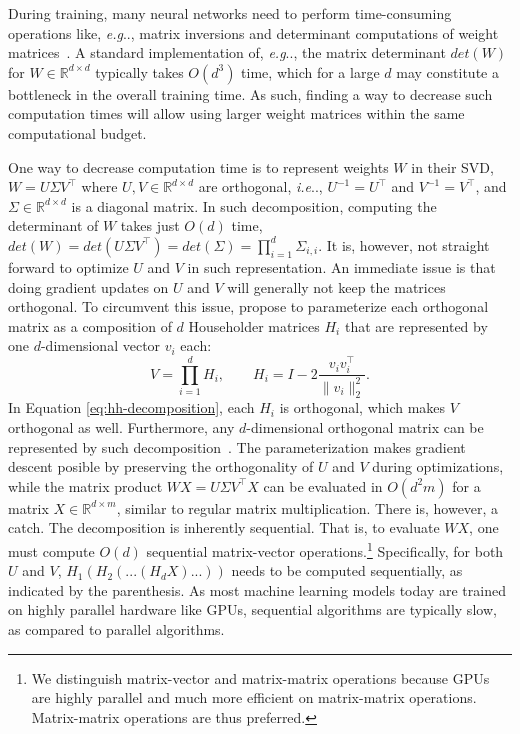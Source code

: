 \documentclass[11pt,a4paper,twoside,openright,final]{memoir}
\makeatletter
\DeclareRobustCommand\onedot{\futurelet\@let@token\@onedot}
\def\@onedot{\ifx\@let@token.\else.\null\fi\xspace}
\def\eg{\emph{e.g}\onedot} \def\Eg{\emph{E.g}\onedot}
\def\ie{\emph{i.e}\onedot} \def\Ie{\emph{I.e}\onedot}
\makeatother
\begin{document}
During training, many neural networks need to perform time-consuming operations like, \eg, matrix inversions and determinant computations of weight matrices~\cite{nice, realnvp, glow}.
A standard implementation of, \eg, the matrix determinant $det(W)$ for $W\in\mathbb{R}^{d\times d}$ typically takes $O(d^3)$ time, which for a large $d$ may constitute a bottleneck in the overall training time. 
As such, finding a way to decrease such computation times will allow using larger weight matrices within the same computational budget.

One way to decrease computation time is to represent weights $W$ in their SVD, $W = U\Sigma V^\intercal$ where $U, V \in \mathbb{R}^{d\times d}$ are orthogonal, \ie, $U^{-1} = U^\intercal$ and $V^{-1}= V^\intercal$, and $\Sigma\in \mathbb{R}^{d\times d}$ is a diagonal matrix. 
In such decomposition, computing the determinant of $W$ takes just $O(d)$ time, $det(W) = det(U\Sigma V^\intercal) = det(\Sigma) = \prod_{i=1}^d \Sigma_{i,i}$.
It is, however, not straight forward to optimize $U$ and $V$ in such representation.
An immediate issue is that doing gradient updates on $U$ and $V$ will generally not keep the matrices orthogonal.
To circumvent this issue, \citet{sequential} propose to parameterize each orthogonal matrix as a composition of $d$ Householder matrices $H_i$ that are represented by one $d$-dimensional vector $v_i$ each:
\begin{equation}\label{eq:hh-decomposition}
    V = \prod_{i=1}^d H_i, \qquad H_i = I - 2\frac{v_i v_i^\intercal}{\| v_i \|_2^2}.
\end{equation}
In Equation \ref{eq:hh-decomposition}, each $H_i$ is orthogonal, which makes $V$ orthogonal as well. Furthermore, any $d$-dimensional orthogonal matrix can be represented by such decomposition~\cite{uhlig2001constructive}. 
The parameterization makes gradient descent posible by preserving the orthogonality of $U$ and $V$ during optimizations, while the matrix product $WX = U \Sigma V^\intercal X$ can be evaluated in $O(d^2m)$ for a matrix $X\in\mathbb{R}^{d\times m}$, similar to regular matrix multiplication. 
There is, however, a catch.
The decomposition is inherently sequential. 
That is, to evaluate $WX$, one must compute $O(d)$ sequential matrix-vector operations.\footnote{We distinguish matrix-vector and matrix-matrix operations because GPUs are highly parallel and much more efficient on matrix-matrix operations. Matrix-matrix operations are thus preferred.}
Specifically, for both $U$ and $V$, $H_1(H_2(...(H_dX) ...))$ needs to be computed sequentially, as indicated by the parenthesis.
As most machine learning models today are trained on highly parallel hardware like GPUs, sequential algorithms are typically slow, as compared to parallel algorithms.
\end{document}
